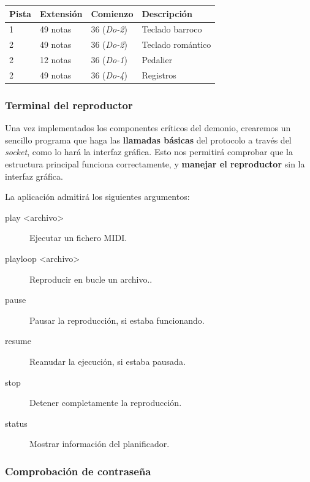 \documentclass[10pt,a4paper]{article}
\begin{document}
	\begin{center}
		\begin{tabular}{|l|l|l|l|}
			\hline \textbf{Pista} & \textbf{Extensión} & \textbf{Comienzo} & \textbf{Descripción} \\ 
			\hline 1 & 49 notas & 36 (\textit{Do-2}) & Teclado barroco \\
			\hline 2 & 49 notas & 36 (\textit{Do-2}) & Teclado romántico \\
			\hline 2 & 12 notas & 36 (\textit{Do-1}) & Pedalier \\
			\hline 2 & 49 notas & 36 (\textit{Do-4}) & Registros \\
			\hline 
		\end{tabular}
	\end{center}
	
	\subsubsection*{Terminal del reproductor}
	
	Una vez implementados los componentes críticos del demonio, crearemos un sencillo programa que haga las \textbf{llamadas básicas} del protocolo a través del \textit{socket}, como lo hará la interfaz gráfica. Esto nos permitirá comprobar que la estructura principal funciona correctamente, y \textbf{manejar el reproductor} sin la interfaz gráfica.
	
	La aplicación admitirá los siguientes argumentos:
	
	
	\begin{description}
		\item[play <archivo>] Ejecutar un fichero MIDI.
		\item[playloop <archivo>] Reproducir en bucle un archivo..
		\item[pause] Pausar la reproducción, si estaba funcionando.
		\item[resume] Reanudar la ejecución, si estaba pausada.
		\item[stop] Detener completamente la reproducción.
		\item[status] Mostrar información del planificador.
	\end{description}
	
	\subsubsection*{Comprobación de contraseña}
	
\end{document}

